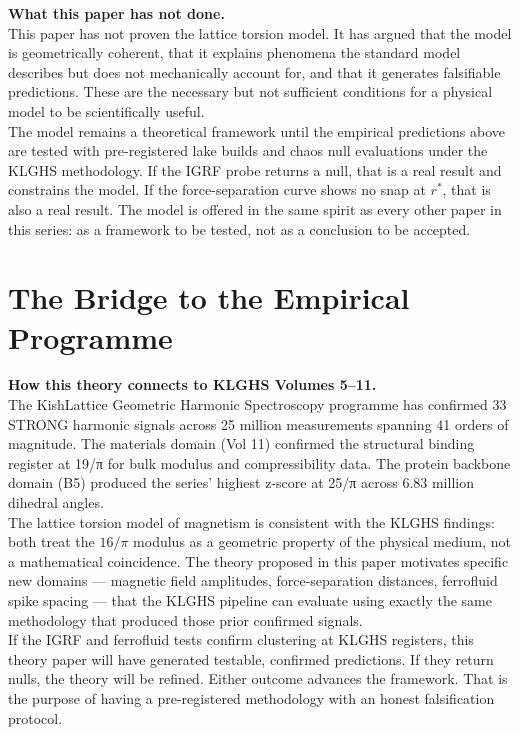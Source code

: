 \documentclass[11pt, letterpaper, openany]{book}
\begin{document}
\begin{warningbox}
\textbf{What this paper has not done.}\\[0.5em]
This paper has not proven the lattice torsion model. It has argued
that the model is geometrically coherent, that it explains phenomena
the standard model describes but does not mechanically account for,
and that it generates falsifiable predictions. These are the necessary
but not sufficient conditions for a physical model to be scientifically
useful.\\[0.5em]
The model remains a theoretical framework until the empirical predictions
above are tested with pre-registered lake builds and chaos null
evaluations under the KLGHS methodology. If the IGRF probe returns a
null, that is a real result and constrains the model. If the
force-separation curve shows no snap at $r^*$, that is also a real
result. The model is offered in the same spirit as every other paper
in this series: as a framework to be tested, not as a conclusion to
be accepted.
\end{warningbox}

\section{The Bridge to the Empirical Programme}

\begin{empiricalbox}
\textbf{How this theory connects to KLGHS Volumes 5--11.}\\[0.5em]
The KishLattice Geometric Harmonic Spectroscopy programme has confirmed
33 STRONG harmonic signals across 25 million measurements spanning 41
orders of magnitude. The materials domain (Vol 11) confirmed the
structural binding register at 19/π for bulk modulus and compressibility
data. The protein backbone domain (B5) produced the series' highest
z-score at 25/π across 6.83 million dihedral angles.\\[0.5em]
The lattice torsion model of magnetism is consistent with the KLGHS
findings: both treat the $16/\pi$ modulus as a geometric property of the
physical medium, not a mathematical coincidence. The theory proposed in
this paper motivates specific new domains — magnetic field amplitudes,
force-separation distances, ferrofluid spike spacing — that the KLGHS
pipeline can evaluate using exactly the same methodology that produced
those prior confirmed signals.\\[0.5em]
If the IGRF and ferrofluid tests confirm clustering at KLGHS registers,
this theory paper will have generated testable, confirmed predictions.
If they return nulls, the theory will be refined. Either outcome advances
the framework. That is the purpose of having a pre-registered methodology
with an honest falsification protocol.
\end{empiricalbox}
\end{document}
